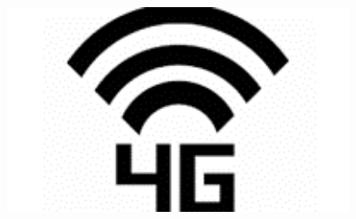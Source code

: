 \documentclass[aspectratio=169,
				xcolor=table]{beamer}
\begin{document}
\begin{frame}
\begin{columns}
\begin{column}{0.23\textwidth}
				\begin{figure}
					\centering
					\includegraphics[width=0.9\textwidth, keepaspectratio]{../figs/cap03/quatrog} 			
				\end{figure}
			\end{column}
		\end{columns}
	\end{frame}	
	
\end{document}
